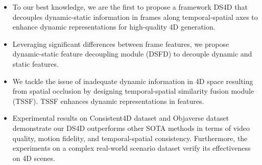 \begin{itemize}
\item{To our best knowledge, we are the first to propose a framework DS4D that decouples dynamic-static information in frames along temporal-spatial axes to enhance dynamic representations for high-quality 4D generation.}
\item{Leveraging significant differences between frame features, we propose dynamic-static feature decoupling module (DSFD) to decouple dynamic and static features.}
\item{We tackle the issue of inadequate dynamic information in 4D space resulting from spatial occlusion by designing temporal-spatial similarity fusion module (TSSF). TSSF enhances dynamic representations in features.}

\item{Experimental results on Consistent4D dataset \cite{jiang2024consistentd} and Objaverse dataset \cite{deitke2023objaverse} demonstrate our DS4D outperforms other SOTA methods in terms of video quality, motion fidelity, and temporal-spatial consistency. Furthermore, the experiments on a complex real-world scenario dataset \cite{li2022neural} verify its effectiveness on 4D scenes.}
\end{itemize}


